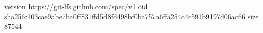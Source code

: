 version https://git-lfs.github.com/spec/v1
oid sha256:103cae9abe7ba0ff831ffd5d8fd498bf0ba757a6ffa254c4c591b9197d06ac66
size 87544
